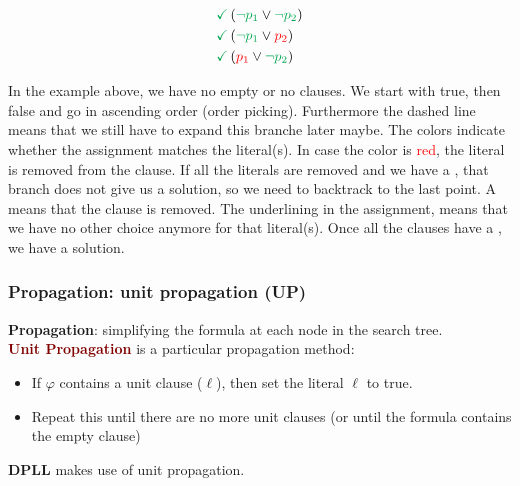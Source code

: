 \begin{minipage}[t]{0.2\textwidth}
$$
\begin{aligned}
\text{\textcolor{Green}{\checkmark}} &\left(\text{\textcolor{Green}{$\neg p_1$}} \vee \text{\textcolor{Green}{$\neg p_{2}$}}\right) \\
\textcolor{Green}{\checkmark} &\left(\text{\textcolor{Green}{$\neg p_1$}}  \vee \text{\textcolor{red}{$p_{2}$}}\right) \\
\text{\textcolor{Green}{\checkmark}} &\left(\text{\textcolor{red}{$p_1$}} \vee \text{\textcolor{Green}{$\neg p_{2}$}}\right)
\end{aligned}
$$
\vspace{0.1cm}
\end{minipage}

In the example above, we have no empty or no clauses. We start with true, then false and go in ascending order (order picking). Furthermore the dashed line means that we still have to expand this branche later maybe. The colors indicate whether the assignment matches the literal(s). In case the color is \textcolor{red}{red}, the literal is removed from the clause. If all the literals are removed and we have a \textcolor{red}{\xmark}, that branch does not give us a solution, so we need to backtrack to the last point. A \textcolor{Green}{\checkmark} means that the clause is removed. The underlining in the assignment, means that we have no other choice anymore for that literal(s). Once all the clauses have a \textcolor{Green}{\checkmark}, we have a solution.

\newpage
\subsubsection{Propagation: unit propagation (UP)}
\textbf{Propagation}: simplifying the formula at each node in the search tree. \\
\textbf{\textcolor{Maroon}{Unit Propagation}} is a particular propagation method:
\begin{itemize}
    \item If $\varphi$ contains a \textcolor{NavyBlue}{unit clause} ($\ell$), then set the literal $\ell$ to true. 
    \item Repeat this until there are no more unit clauses (or until the formula contains the empty clause)
\end{itemize}
\vspace{0.25cm}
\textbf{\textcolor{WildStrawberry}{DPLL}} makes use of unit propagation.

